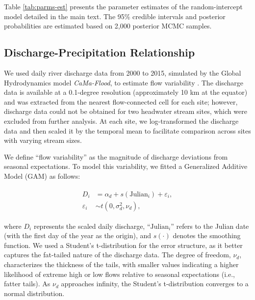 \documentclass[11pt, class=article, crop=false]{standalone}
\theoremstyle{definition}
\begin{document}
Table \ref{tab:parms-est} presents the parameter estimates of the random-intercept model detailed in the main text.
The 95\% credible intervals and posterior probabilities are estimated based on 2,000 posterior MCMC samples.

\vspace{0.5cm} 

\vspace{0.5cm} 

\subsection{Discharge-Precipitation Relationship}
We used daily river discharge data from 2000 to 2015, simulated by the Global Hydrodynamics model \textit{CaMa-Flood}, to estimate flow variability  \cite{yamazaki_deriving_2009, kimura_methodology_2023, lin_global_2019}.
The discharge data is available at a 0.1-degree resolution (approximately 10 km at the equator) and was extracted from the nearest flow-connected cell for each site; however, discharge data could not be obtained for two headwater stream sites, which were excluded from further analysis.
At each site, we log-transformed the discharge data and then scaled it by the temporal mean to facilitate comparison across sites with varying stream sizes.

We define ``flow variability'' as the magnitude of discharge deviations from seasonal expectations.
To model this variability, we fitted a Generalized Additive Model (GAM) as follows:

\begin{align}
    \begin{split}
    D_i &= \alpha_d + s(\mbox{Julian}_i) + \varepsilon_i,\\
    \varepsilon_i &\sim t(0, \sigma_d^2, \nu_d),
    \end{split}
\end{align}

where $D_i$ represents the scaled daily discharge, ``$\mbox{Julian}_i$'' refers to the Julian date (with the first day of the year as the origin), and $s(\cdot)$ denotes the smoothing function.
We used a Student's t-distribution for the error structure, as it better captures the fat-tailed nature of the discharge data.
The degree of freedom, $\nu_d$, characterizes the thickness of the tails, with smaller values indicating a higher likelihood of extreme high or low flows relative to seasonal expectations (i.e., fatter tails).
As $\nu_d$ approaches infinity, the Student's t-distribution converges to a normal distribution.
\end{document}
